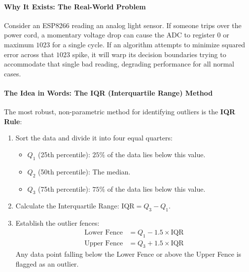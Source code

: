\paragraph{Why It Exists: The Real-World Problem}
Consider an ESP8266 reading an analog light sensor. If someone trips over the power cord, a momentary voltage drop can cause the ADC to register $0$ or maximum $1023$ for a single cycle. If an algorithm attempts to minimize squared error across that $1023$ spike, it will warp its decision boundaries trying to accommodate that single bad reading, degrading performance for all normal cases.

\paragraph{The Idea in Words: The IQR (Interquartile Range) Method}
The most robust, non-parametric method for identifying outliers is the \textbf{IQR Rule}:
\begin{enumerate}
    \item Sort the data and divide it into four equal quarters:
    \begin{itemize}
        \item $Q_1$ (25th percentile): $25\%$ of the data lies below this value.
        \item $Q_2$ (50th percentile): The median.
        \item $Q_3$ (75th percentile): $75\%$ of the data lies below this value.
    \end{itemize}
    \item Calculate the Interquartile Range: $\text{IQR} = Q_3 - Q_1$.
    \item Establish the outlier fences:
    \begin{align}
    \text{Lower Fence} &= Q_1 - 1.5 \times \text{IQR}\label{eq:iqr_lower} \\
    \text{Upper Fence} &= Q_3 + 1.5 \times \text{IQR}\label{eq:iqr_upper}
    \end{align}
    Any data point falling below the Lower Fence or above the Upper Fence is flagged as an outlier.
\end{enumerate}

